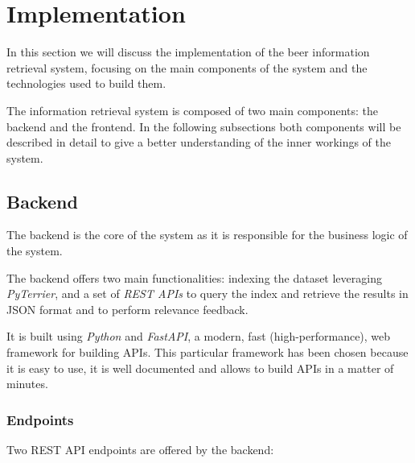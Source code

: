 \section{Implementation}

In this section we will discuss the implementation of the beer information retrieval system, focusing on the main components of the system and the technologies used to build them.

The information retrieval system is composed of two main components: the backend and the frontend. In the following subsections both components will be described in detail to give a better understanding of the inner workings of the system.


\subsection{Backend}

The backend is the core of the system as it is responsible for the business logic of the system.

The backend offers two main functionalities: indexing the dataset leveraging \textit{PyTerrier}, and a set of \textit{REST APIs} to query the index and retrieve the results in JSON format and to perform relevance feedback.

It is built using \textit{Python} and \textit{FastAPI}, a modern, fast (high-performance), web framework for building APIs. This particular framework has been chosen because it is easy to use, it is well documented and allows to build APIs in a matter of minutes.

\subsubsection{Endpoints}

Two REST API endpoints are offered by the backend:

